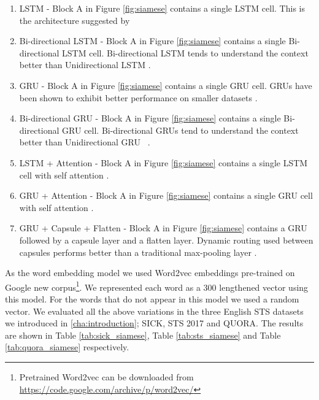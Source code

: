 \begin{enumerate}
	\item LSTM - Block A in Figure \ref{fig:siamese} contains a single LSTM cell. This is the architecture suggested by \citet{Mueller_Thyagarajan_2016} 
	
	\item Bi-directional LSTM - Block A in Figure \ref{fig:siamese} contains a single Bi-directional LSTM cell. Bi-directional LSTM tends to understand the context better than Unidirectional LSTM \cite{650093}.
	
	\item GRU - Block A in Figure \ref{fig:siamese} contains a single GRU cell. GRUs have been shown to exhibit better performance on smaller datasets \cite{Chung2014EmpiricalEO}. 
	
	\item Bi-directional GRU - Block A in Figure \ref{fig:siamese} contains a single Bi-directional GRU cell. Bi-directional GRUs tend to understand the context better than Unidirectional GRU ~\cite{vukotic:hal-01351733}.
	
	\item LSTM + Attention - Block A in Figure \ref{fig:siamese} contains a single LSTM cell with self attention \cite{NIPS2017_3f5ee243}.
	
	\item GRU + Attention - Block A in Figure \ref{fig:siamese} contains a single GRU cell with self attention \cite{NIPS2017_3f5ee243}.
	
	\item GRU + Capsule + Flatten - Block A in Figure \ref{fig:siamese} contains a GRU followed by a capsule layer and a flatten layer. Dynamic routing used between capsules performs better than a traditional max-pooling layer \cite{NIPS2017_2cad8fa4}.
	
\end{enumerate}
	
	
	As the word embedding model we used Word2vec embeddings \cite{DBLP:journals/corr/abs-1301-3781} pre-trained on Google new corpus\footnote{Pretrained Word2vec can be downloaded from \url{https://code.google.com/archive/p/word2vec/}}. We represented each word as a 300 lengthened vector using this model. For the words that do not appear in this model we used a random vector. We evaluated all the above variations in 
	the three English STS datasets we introduced in \ref{cha:introduction}; SICK, STS 2017 and QUORA. The results are shown in Table \ref{tab:sick_siamese}, Table \ref{tab:sts_siamese} and Table \ref{tab:quora_siamese} respectively. 
	
